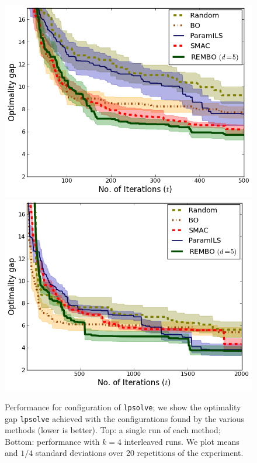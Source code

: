 \documentclass{article}
\begin{document}
\begin{figure}[h!]
\begin{center}
  \includegraphics[scale=0.35]{figures/lpsolve.png}\\
  \includegraphics[scale=0.35]{figures/lpsolve_interleave.png}
  \caption{Performance for configuration of \texttt{lpsolve}; we show the optimality gap \texttt{lpsolve} achieved with the configurations found by the various methods (lower is better). Top: a single run of each method; Bottom: performance with $k=4$ interleaved runs. We plot means and $1/4$ standard deviations over 20 repetitions of the experiment.
        }
\label{fig:lpsolve}
\end{center}
\vspace*{-3mm}
\end{figure}
\end{document}
